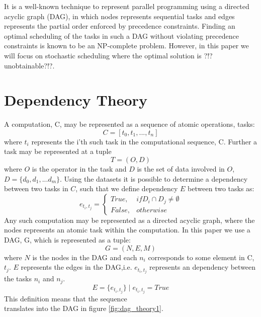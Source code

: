 \documentclass{acm_proc_article-sp}
\begin{document}
It is a well-known technique to represent parallel programming using a directed acyclic graph (DAG), in which nodes represents sequential tasks and edges represents the partial order enforced by precedence constraints. Finding an optimal scheduling of the tasks in such a DAG without violating precedence constraints is known to be an NP-complete problem\cite{Garey1979}. However, in this paper we will focus on stochastic scheduling where the optimal solution is ?!?unobtainable?!?.

\cite{Buttari09}

\cite{Song09}





\section{Dependency Theory}
A computation, C, may be represented as a sequence of atomic operations, tasks:
\begin{equation*}
C=[t_0,t_1,...,t_n]
\end{equation*}
where $t_i$ represents the i'th such task in the computational sequence, C. Further a task may be represented at a tuple
\begin{equation*}
T=(O,D)
\end{equation*}
where $O$ is the operator in the task and $D$ is the set of data involved in $O$, $D=\{d_0,d_1,...d_m\}$. Using the datasets it is possible to determine a dependency between two tasks in $C$, such that we define dependency $E$ between two tasks as:
\begin{equation*}
e_{t_i, t_j} = 
 \left\{
	\begin{matrix}
        True, & if D_i \cap D_j \neq \emptyset\\
        False, & otherwise
    \end{matrix}
 \right.
\end{equation*}
Any such computation may be represented as a directed acyclic graph, where the nodes represents an atomic task within the computation. In this paper we use a DAG, G, which is represented as a tuple:
\begin{equation*}
G=(N,E,M)
\end{equation*}
where $N$ is the nodes in the DAG and each $n_i$ corresponds to some element in C, $t_j$. $E$ represents the edges in the DAG,i.e. $e_{t_i,t_j}$ represents an dependency between the tasks $n_i$ and $n_j$.
\begin{equation*}
E = \{e_{t_i,t_j}\} \mid e_{t_i,t_j}=True
\end{equation*}
This definition means that the sequence
\begin{equation*}
[(+,c,a,b),(+,e,c,d),(f,c,e)]
\end{equation*}
translates into the DAG in figure \ref{fig:dag_theory1}.
\end{document}
